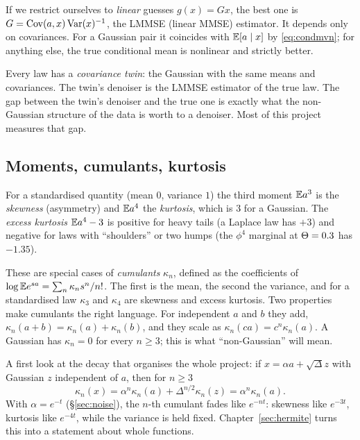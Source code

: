 If we restrict ourselves to \emph{linear} guesses $g(x)=Gx$, the best one is
$G=\operatorname{Cov}(a,x)\operatorname{Var}(x)^{-1}$, the LMMSE (linear MMSE) estimator. It depends only on covariances. For a Gaussian
pair it coincides with $\mathbb{E}[a\mid x]$ by \eqref{eq:condmvn}; for anything else, the true conditional mean is
nonlinear and strictly better.

\begin{keyidea}
Every law has a \emph{covariance twin}: the Gaussian with the same means and covariances. The twin's
denoiser is the LMMSE estimator of the true law. The gap between the twin's denoiser and the true one is
exactly what the non-Gaussian structure of the data is worth to a denoiser. Most of this project measures
that gap.
\end{keyidea}

\subsection{Moments, cumulants, kurtosis}\label{sec:cumulants}

For a standardised quantity (mean $0$, variance $1$) the third moment $\mathbb{E} a^3$ is the \emph{skewness}
(asymmetry) and $\mathbb{E} a^4$ the \emph{kurtosis}, which is $3$ for a Gaussian. The \emph{excess kurtosis}
$\mathbb{E} a^4-3$ is positive for heavy tails (a Laplace law has $+3$) and negative for laws with ``shoulders'' or
two humps (the $\phi^4$ marginal at $\Theta=0.3$ has $-1.35$).

These are special cases of \emph{cumulants} $\kappa_n$, defined as the coefficients of
$\log\mathbb{E} e^{sa}=\sum_n\kappa_ns^n/n!$. The first is the mean, the second the variance, and for a standardised
law $\kappa_3$ and $\kappa_4$ are skewness and excess kurtosis. Two properties make cumulants the right
language. For independent $a$ and $b$ they add, $\kappa_n(a+b)=\kappa_n(a)+\kappa_n(b)$, and they scale as
$\kappa_n(ca)=c^n\kappa_n(a)$. A Gaussian has $\kappa_n=0$ for every $n\ge3$; this is what ``non-Gaussian'' will
mean.

A first look at the decay that organises the whole project: if $x=\alpha a+\sqrt\Delta z$ with Gaussian $z$
independent of $a$, then for $n\ge3$
\begin{equation}\label{eq:cumdecay}
  \kappa_n(x)=\alpha^n\kappa_n(a)+\Delta^{n/2}\kappa_n(z)=\alpha^n\kappa_n(a).
\end{equation}
With $\alpha=e^{-t}$ (\S\ref{sec:noise}), the $n$-th cumulant fades like $e^{-nt}$: skewness like $e^{-3t}$,
kurtosis like $e^{-4t}$, while the variance is held fixed. Chapter~\ref{sec:hermite} turns this into a
statement about whole functions.

